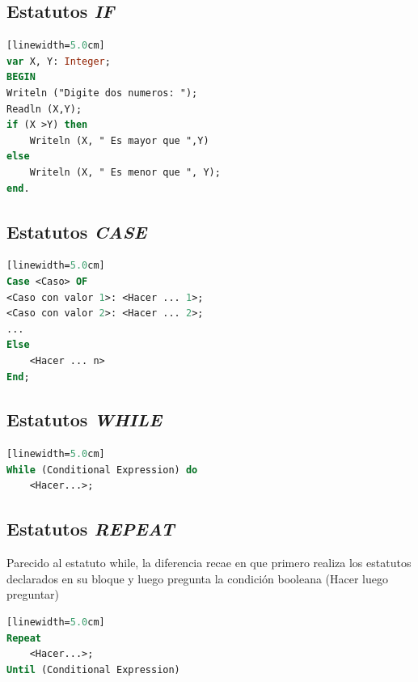 \documentclass[10pt,journal,compsoc]{IEEEtran}
\begin{document}
\subsection{Estatutos \emph{IF}}
\begin{lstlisting}[language=Pascal, caption = {Sintaxis de un IF}][linewidth=5.0cm]
var X, Y: Integer;
BEGIN
Writeln ("Digite dos numeros: ");
Readln (X,Y);
if (X >Y) then
	Writeln (X, " Es mayor que ",Y)
else
	Writeln (X, " Es menor que ", Y);
end.
\end{lstlisting}

\subsection{Estatutos \emph{CASE}}
\begin{lstlisting}[language=Pascal, caption = {Sintaxis de un Case}][linewidth=5.0cm]
Case <Caso> OF
<Caso con valor 1>: <Hacer ... 1>;
<Caso con valor 2>: <Hacer ... 2>;
...
Else
	<Hacer ... n>
End;
\end{lstlisting}

\subsection{Estatutos \emph{WHILE}}
\begin{lstlisting}[language=Pascal, caption = {Sintaxis de un While}][linewidth=5.0cm]
While (Conditional Expression) do
	<Hacer...>;
\end{lstlisting}

\subsection{Estatutos \emph{REPEAT}}
\par Parecido al estatuto while, la diferencia recae en que primero realiza los estatutos declarados en su bloque y luego pregunta la condici\'on booleana (Hacer luego preguntar)
\begin{lstlisting}[language=Pascal, caption = {Sintaxis de un Repeat}][linewidth=5.0cm]
Repeat
	<Hacer...>;
Until (Conditional Expression)
\end{lstlisting}
\end{document}
